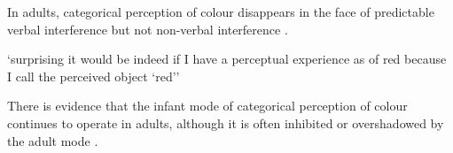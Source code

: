 \documentclass[12pt]{extarticle}
\begin{document}
\begin{multicols}{3}
In adults, categorical perception of colour disappears in the face of predictable verbal interference but not non-verbal interference
\citep{Roberson:2000ge,Pilling:2003bi,Wiggett:2008xt}.
 
‘surprising it would be indeed if I have a perceptual experience as of red because I call the perceived object ‘red’’
\citep[pp.\ 324--5]{Stokes:2006fd}
 
There is evidence that the infant mode of categorical perception of colour continues to operate in adults, although it is often inhibited or overshadowed by the adult mode \citep{Gilbert:2006yb}.
 
 
 
\footnotesize 


\end{multicols}
\end{document}
